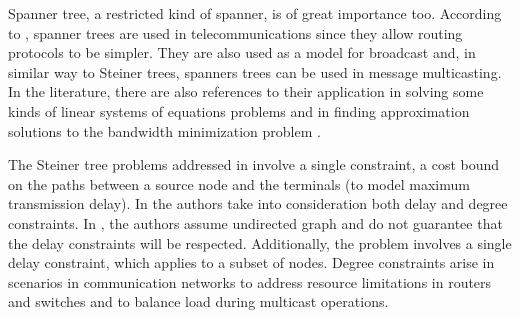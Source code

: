 Spanner tree, a restricted kind of spanner, is of great importance too. According to \cite{Liebchen2008}, spanner trees are used in telecommunications since 
they allow routing protocols to be simpler. They are also used as a model for broadcast \cite{Peleg2000} and, in similar way to Steiner trees, 
spanners trees can be used in message multicasting. In the literature, there are also references to their application in solving 
some kinds of linear systems of equations problems \cite{Elkin2005} and in finding approximation solutions to the bandwidth minimization problem \cite{Venkatesan1997}.



The Steiner tree problems addressed in \cite{Raghavan1998,Feng1999,Sun1995,Parsa1998} involve a single constraint, a cost bound  
on the paths between a source node and the terminals (to model maximum transmission delay).
In \cite{Chen2004} the authors take into consideration both delay and degree constraints.  
In \cite{Chen2004}, the authors assume undirected graph and do not guarantee that the delay constraints will be respected. Additionally, 
the problem involves a single delay constraint, which applies to a subset of nodes. 
Degree constraints arise in scenarios in communication networks to address resource limitations in 
routers and switches and to balance load during multicast operations. 

